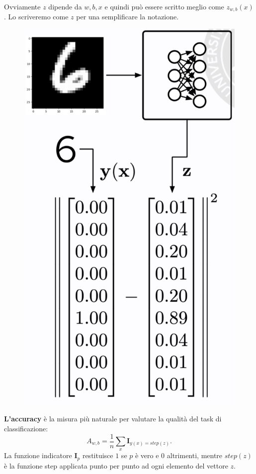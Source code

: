 Ovviamente $z$ dipende da $w,b,x$ e quindi può essere scritto meglio come $z_{w,b}(x)$. Lo scriveremo come $z$ per una semplificare la notazione.
\begin{figure}[!h]
    \includegraphics[scale=.5]{images/gradient_descent/cost_fun.png}
    \centering
\end{figure}
\newpage
\textbf{L'accuracy} è la misura più naturale per valutare la qualità del task di classificazione:
\begin{equation}
    A_{w,b}=\frac{1}{n}\sum_x\mathbf{I}_{y(x)=step(z)}.
\end{equation}
La funzione indicatore $\mathbf{I}_p$ restituisce $1$ se $p$ è vero e $0$ altrimenti, mentre $step(z)$ è la funzione step applicata punto per punto ad ogni elemento del vettore $z$.


